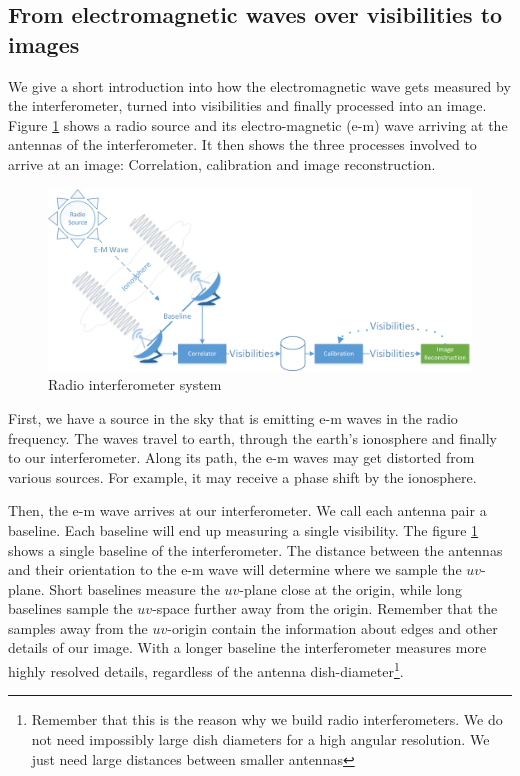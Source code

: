 \subsection{From electromagnetic waves over visibilities to images}
We give a short introduction into how the electromagnetic wave gets measured by the interferometer, turned into visibilities and finally processed into an image. Figure \ref{intro:system} shows a radio source and its electro-magnetic (e-m) wave arriving at the antennas of the interferometer. It then shows the three processes involved to arrive at an image: Correlation, calibration and image reconstruction.
	
\begin{figure}[h]
	\centering
	\includegraphics[width=0.80\linewidth]{./chapters/01.intro/system.png}
	\caption{Radio interferometer system}
	\label{intro:system}
\end{figure}

First, we have a source in the sky that is emitting e-m waves in the radio frequency. The waves travel to earth, through the earth's ionosphere and finally to our interferometer. Along its path, the e-m waves may get distorted from various sources. For example, it may receive a phase shift by the ionosphere.

Then, the e-m wave arrives at our interferometer. We call each antenna pair a baseline. Each baseline will end up measuring a single visibility. The figure \ref{intro:system} shows a single baseline of the interferometer. The distance between the antennas and their orientation to the e-m wave will determine where we sample the $uv$-plane. Short baselines measure the $uv$-plane close at the origin, while long baselines sample the $uv$-space further away from the origin. Remember that the samples away from the $uv$-origin contain the information about edges and other details of our image. With a longer baseline the interferometer measures more highly resolved details, regardless of the antenna dish-diameter\footnote{Remember that this is the reason why we build radio interferometers. We do not need impossibly large dish diameters for a high angular resolution. We just need large distances between smaller antennas}.

